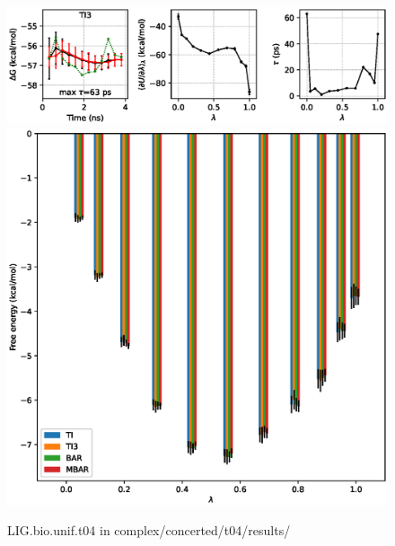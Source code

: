 \documentclass[journal=jctcce,manuscript=article,hyperref=false]{achemso}
\begin{document}
\clearpage
\pagebreak
\begin{figure}
\includegraphics[clip,width=6in]{complex.concerted.t04.results..GvsT.eps}\vspace{-0.3cm}
\includegraphics[clip,width=6in]{complex.concerted.t04.results..GvsL.eps}\vspace{-0.3cm}
\caption{LIG.bio.unif.t04 in complex/concerted/t04/results/}
\end{figure}
\end{document}
